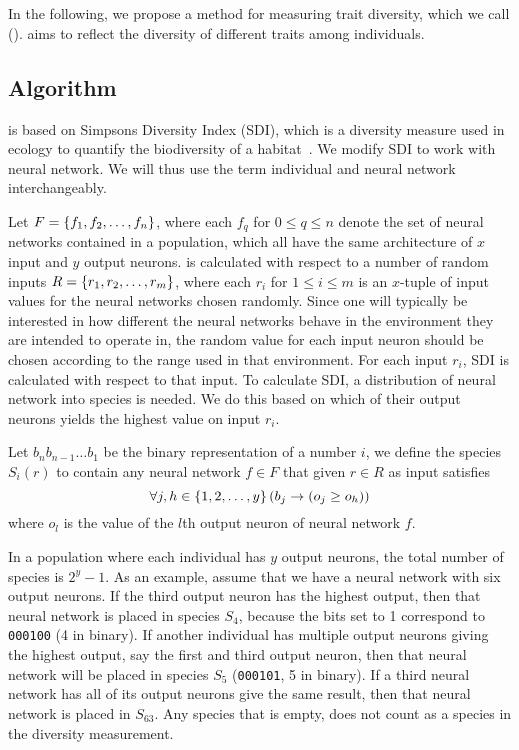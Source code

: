\section{\di{}}\label{sec:nntd}
In the following, we propose a method for measuring trait diversity, which we call \emph{\di{}} (\dia). \dia{} aims to reflect the diversity of different traits among individuals. 

\subsection{Algorithm}
\dia{} is based on Simpsons Diversity Index (SDI), which is a diversity measure used in ecology to quantify the biodiversity of a habitat~\cite{simpson1949measurement}. We modify SDI to work with neural network. We will thus use the term individual and neural network interchangeably.

Let $F = \left\{ f_1, f_2, \dots, f_n \right\}$, where each $f_q$ for $0 \leq q \leq n$ denote the set of neural networks contained in a population, which all have the same architecture of $x$ input and $y$ output neurons. \dia{} is calculated with respect to a number of random inputs $R = \left\{ r_1, r_2, \dots, r_m \right\}$, where each $r_i$ for $1 \leq i \leq m$ is an $x$-tuple of input values for the neural networks chosen randomly.
Since one will typically be interested in how different the neural networks behave in the environment they are intended to operate in, the random value for each input neuron should be chosen according to the range used in that environment. 
For each input $r_i$, SDI is calculated with respect to that input. 
To calculate SDI, a distribution of neural network into species is needed. 
We do this based on which of their output neurons yields the highest value on input $r_i$. 

Let $b_{n}b_{n-1}\dots b_1$ be the binary representation of a number $i$,
we define the species $S_i(r)$ to contain any neural network $f \in F$ that given $r \in R$ as input satisfies
%
\[
  \forall j, h \in \left\{ 1,2,\dots,y \right\} \left(b_j \rightarrow \left(o_j \geq o_h\right)\right)
\]
%
where $o_l$ is the value of the $l$th output neuron of neural network $f$.

In a population where each individual has $y$ output neurons, the total number of species is $2^y - 1$.  As an example, assume that we have a neural network with six output neurons. If the third output neuron has the highest output, then that neural network is placed in species $S_4$, because the bits set to 1 correspond to \texttt{000100} (4 in binary). If another individual has multiple output neurons giving the highest output, say the first and third output neuron, then that neural network will be placed in species $S_5$ (\texttt{000101}, 5 in binary). If a third neural network has all of its output neurons give the same result, then that neural network is placed in $S_{63}$. Any species that is empty, does not count as a species in the diversity measurement.


